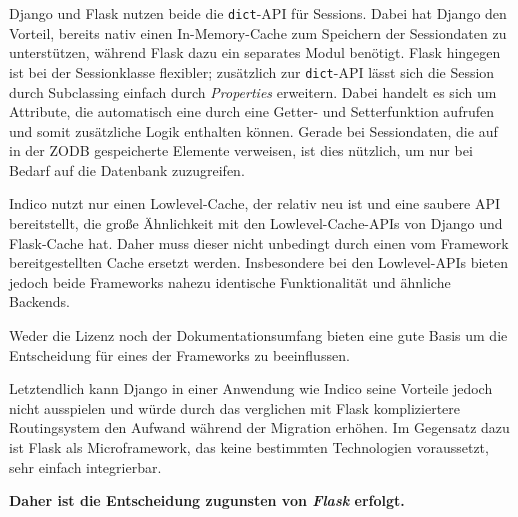 Django und Flask nutzen beide die \lstinline{dict}-API für Sessions. Dabei hat Django den
Vorteil, bereits nativ einen In-Memory-Cache zum Speichern der Sessiondaten zu unterstützen, während
Flask dazu ein separates Modul benötigt. Flask hingegen ist bei der Sessionklasse flexibler;
zusätzlich zur \lstinline{dict}-API lässt sich die Session durch Subclassing einfach durch
\emph{Properties} erweitern. Dabei handelt es sich um Attribute, die automatisch eine durch eine
Getter- und Setterfunktion aufrufen und somit zusätzliche Logik enthalten können. Gerade bei
Sessiondaten, die auf in der ZODB gespeicherte Elemente verweisen, ist dies nützlich, um nur bei
Bedarf auf die Datenbank zuzugreifen.

Indico nutzt nur einen Lowlevel-Cache, der relativ neu ist und eine saubere API bereitstellt, die
große Ähnlichkeit mit den Lowlevel-Cache-APIs von Django und Flask-Cache hat. Daher muss dieser
nicht unbedingt durch einen vom Framework bereitgestellten Cache ersetzt werden. Insbesondere bei
den Lowlevel-APIs bieten jedoch beide Frameworks nahezu identische Funktionalität und ähnliche
Backends.

Weder die Lizenz noch der Dokumentationsumfang bieten eine gute Basis um die Entscheidung für eines
der Frameworks zu beeinflussen.

Letztendlich kann Django in einer Anwendung wie Indico seine Vorteile jedoch nicht ausspielen und
würde durch das verglichen mit Flask kompliziertere Routingsystem den Aufwand während der Migration
erhöhen. Im Gegensatz dazu ist Flask als Microframework, das keine bestimmten Technologien
voraussetzt, sehr einfach integrierbar.

\textbf{Daher ist die Entscheidung zugunsten von \emph{Flask} erfolgt.}
